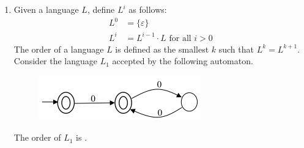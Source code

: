 \documentclass[journal,12pt,onecolumn]{IEEEtran}
\theoremstyle{remark}
\begin{document}
\begin{enumerate}
\item Given a language $L$, define $L^i$ as follows:
\begin{align*}
	L^0 &= \{\varepsilon\} \\
	L^i &= L^{i-1} \cdot L \text{ for all } i > 0
\end{align*}
The order of a language $L$ is defined as the smallest $k$ such that $L^k = L^{k+1}$. Consider the language $L_1$  accepted by the following automaton.
\begin{figure}[H]
	\centering
	\includegraphics[width=0.5\linewidth]{figs/screenshot006}
	\caption{}
	\label{fig:screenshot006}
\end{figure}

The order of $L_1$ is \underline{\hspace{2cm}}.

\hfill{}
\end{enumerate}	
	
\end{document}
